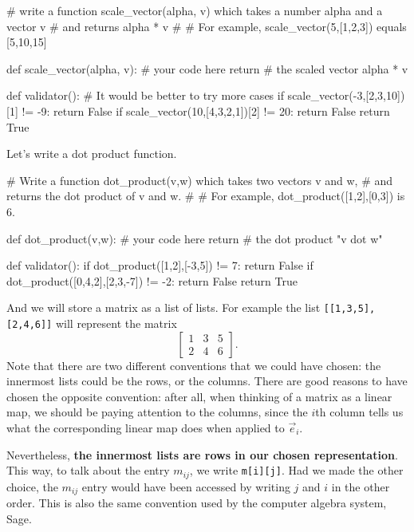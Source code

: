 \documentclass{ximera}
\begin{document}
\begin{exercise}
\begin{solution}
\begin{python}
# write a function scale_vector(alpha, v) which takes a number alpha and a vector v
# and returns alpha * v
#
# For example, scale_vector(5,[1,2,3]) equals [5,10,15]
		
def scale_vector(alpha, v):
  # your code here
  return # the scaled vector alpha * v

def validator():
  # It would be better to try more cases
  if scale_vector(-3,[2,3,10])[1] != -9:
    return False
  if scale_vector(10,[4,3,2,1])[2] != 20:
    return False
  return True

\end{python}
\end{solution}

Let's write a dot product function.

\begin{solution}
\begin{python}
# Write a function dot_product(v,w) which takes two vectors v and w,
# and returns the dot product of v and w.
#
# For example, dot_product([1,2],[0,3]) is 6.
		
def dot_product(v,w):
  # your code here
  return # the dot product "v dot w"

def validator():
  if dot_product([1,2],[-3,5]) != 7:
    return False
  if dot_product([0,4,2],[2,3,-7]) != -2:
    return False
  return True
\end{python}
\end{solution}

\end{exercise}

And we will store a matrix as a list of lists.  For example the list
\verb|[[1,3,5],[2,4,6]]| will represent the matrix
\[
\begin{bmatrix}
 1 & 3 & 5 \\
 2 & 4 & 6  
\end{bmatrix}.
\]
Note that there are two different conventions that we could have
chosen: the innermost lists could be the rows, or the columns.  There
are good reasons to have chosen the opposite convention: after all,
when thinking of a matrix as a linear map, we should be paying
attention to the columns, since the $i$th column tells us what the
corresponding linear map does when applied to $\vec{e}_i$.

Nevertheless, \textbf{the innermost lists are rows in our chosen
  representation}.  This way, to talk about the entry $m_{ij}$, we
write \verb|m[i][j]|.  Had we made the other choice, the $m_{ij}$
entry would have been accessed by writing $j$ and $i$ in the other
order.  This is also the same convention used by the computer algebra
system, Sage.
\end{document}
